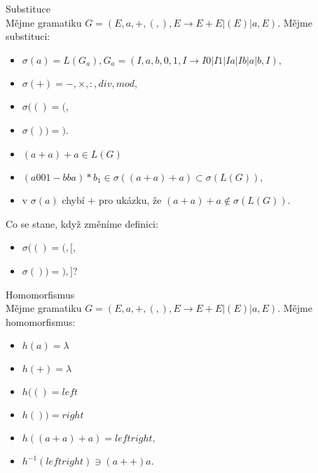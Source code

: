 \documentclass[../main.tex]{subfiles}
\begin{document}
\begin{example}
    Substituce\\
    Mějme gramatiku $G = ({E},{a,+,(,)},{E \rightarrow E + E|(E)|a},E)$. Mějme substituci:
    \begin{itemize}
        \item $\sigma(a) = L(G_a), G_a = ({I},{a,b,0,1},{I\rightarrow I0|I1|Ia|Ib|a|b},I),$
        \item $\sigma(+) = {-,\times,:,div,mod}$,
        \item $\sigma(() = {(}$,
        \item $\sigma()) = {)}$.
    \end{itemize}
    \begin{itemize}
        \item $(a+a) + a \in L(G)$
        \item $(a001 - bba)\ast b_1 \in \sigma((a+a)+a)\subset \sigma(L(G))$,
        \item v $\sigma(a)$ chybí $+$ pro ukázku, že $(a+a) + a \notin \sigma(L(G))$.
    \end{itemize}
    Co se stane, když změníme definici:
    \begin{itemize}
        \item $\sigma(() = {(,[}$,
        \item $\sigma()) = {),]}$?
    \end{itemize}
\end{example}
\begin{example}
    Homomorfismus\\
    Mějme gramatiku $G = ({E},{a,+,(,)},{E \rightarrow E+E|(E)|a},E)$. Mějme homomorfismus:
    \begin{itemize}
        \item $h(a) = \lambda$
        \item $h(+) = \lambda$
        \item $h(() = left$
        \item $h()) = right$
    \end{itemize}
    \begin{itemize}
        \item $h((a+a)+a) = leftright,$
        \item $h^{-1}(leftright) \ni (a + +)a.$
    \end{itemize}
\end{example}
\end{document}
